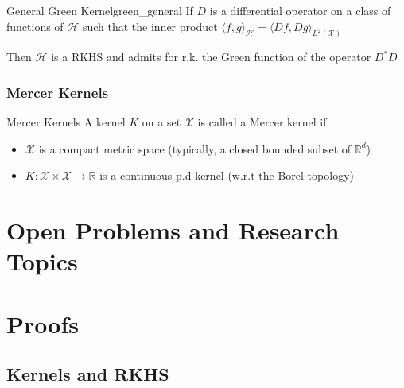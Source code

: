 \documentclass{article}
\begin{document}
\begin{Theorem}{General Green Kernel}{green_general}
  If $D$ is a differential operator on a class of functions of $\mathcal{H}$
  such that the inner product $\langle f, g \rangle_\mathcal{H} = \langle Df, Dg 
  \rangle_{L^2(\mathcal{X})}$

  Then $\mathcal{H}$ is a RKHS and admits for r.k. the Green function of the 
  operator $D^*D$
\end{Theorem}


\subsubsection{Mercer Kernels}

\begin{Definition}{Mercer Kernels}{}
  A kernel $K$ on a set $\mathcal{X}$ is called a Mercer kernel if: 
  \begin{itemize}
    \item $\mathcal{X}$ is a compact metric space (typically, a closed bounded
    subset of $\mathbb{R}^d$)
    \item $K: \mathcal{X}\times\mathcal{X} \rightarrow \mathbb{R}$ is a
    continuous p.d kernel (w.r.t the Borel topology)
  \end{itemize}
\end{Definition}

\section{Open Problems and Research Topics}



\appendix

\section{Proofs}

\subsection{Kernels and RKHS}
\end{document}
